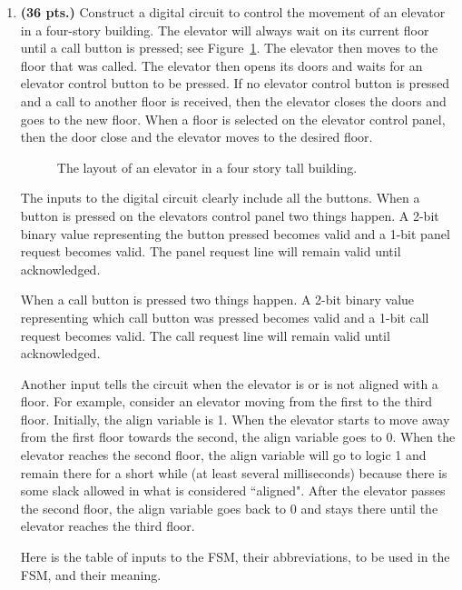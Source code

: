 \begin{enumerate}
\begin{onlysolution}
{}\end{onlysolution} 


\item \textbf{ (36 pts.)}
Construct a digital circuit to control the movement of an elevator
in a four-story building.  The elevator will always wait on its current floor
until a call button is pressed; see Figure~\ref{fig:elevator}.  The elevator
then moves to the floor that was called.  The elevator then opens its doors and
waits for an elevator control button to be pressed.  If no elevator control
button is pressed and a call to another floor is received, then the elevator
closes the doors and goes to the new floor.  When a floor is selected on the
elevator control panel, then the door close and the elevator moves to the
desired floor.

\begin{figure}[ht]
\caption{The layout of an elevator in a four story tall building.}
\label{fig:elevator}
\end{figure}

The inputs to the digital circuit clearly include all the buttons.
When a button is pressed on the elevators control panel two things
happen.  A 2-bit binary value representing the button pressed
becomes valid and a 1-bit panel request becomes valid.  The
panel request line will remain valid until acknowledged.

When a call button is pressed two things happen.  A 2-bit binary value
representing which call button was pressed becomes valid and a 1-bit
call request becomes valid.  The call request line will remain valid
until acknowledged.

Another input tells the circuit when the
elevator is or is not aligned with a floor.  For example, consider
an elevator moving from the first to the third floor.  Initially, the
align variable is 1.  When the elevator starts
to move away from the first floor towards the second, the align
variable goes to 0.  When the elevator reaches the second floor, the
align variable will go to logic 1 and remain there for a short
while (at least several milliseconds) because there is some
slack allowed in what is considered ``aligned".  After the elevator
passes the second floor, the align variable goes back to 0 and stays
there until the elevator reaches the third floor.

Here is the table of inputs to the FSM, their abbreviations, to be
used in the FSM, and their meaning.


\end{enumerate}

